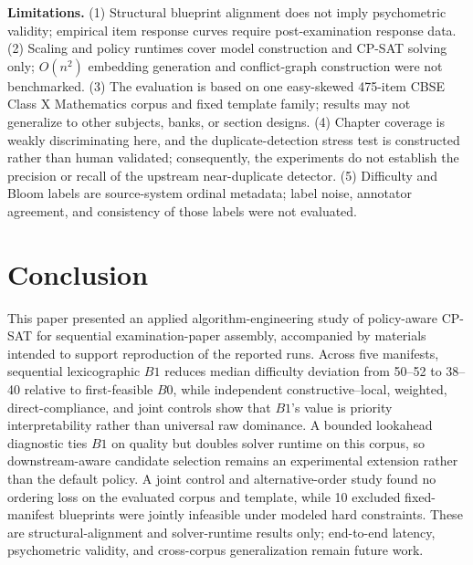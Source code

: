 \documentclass[runningheads]{llncs}
\begin{document}
\noindent\textbf{Limitations.} (1) Structural blueprint alignment does not imply psychometric validity; empirical item response curves require post-examination response data. (2) Scaling and policy runtimes cover model construction and CP-SAT solving only; $O(n^2)$ embedding generation and conflict-graph construction were not benchmarked. (3) The evaluation is based on one easy-skewed 475-item CBSE Class X Mathematics corpus and fixed template family; results may not generalize to other subjects, banks, or section designs. (4) Chapter coverage is weakly discriminating here, and the duplicate-detection stress test is constructed rather than human validated; consequently, the experiments do not establish the precision or recall of the upstream near-duplicate detector. (5) Difficulty and Bloom labels are source-system ordinal metadata; label noise, annotator agreement, and consistency of those labels were not evaluated.

\section{Conclusion}
\label{sec:conclusion}

This paper presented an applied algorithm-engineering study of policy-aware CP-SAT for sequential examination-paper assembly, accompanied by materials intended to support reproduction of the reported runs. Across five manifests, sequential lexicographic $B1$ reduces median difficulty deviation from 50--52 to 38--40 relative to first-feasible $B0$, while independent constructive--local, weighted, direct-compliance, and joint controls show that $B1$'s value is priority interpretability rather than universal raw dominance. A bounded lookahead diagnostic ties $B1$ on quality but doubles solver runtime on this corpus, so downstream-aware candidate selection remains an experimental extension rather than the default policy. A joint control and alternative-order study found no ordering loss on the evaluated corpus and template, while 10 excluded fixed-manifest blueprints were jointly infeasible under modeled hard constraints. These are structural-alignment and solver-runtime results only; end-to-end latency, psychometric validity, and cross-corpus generalization remain future work.
\end{document}
